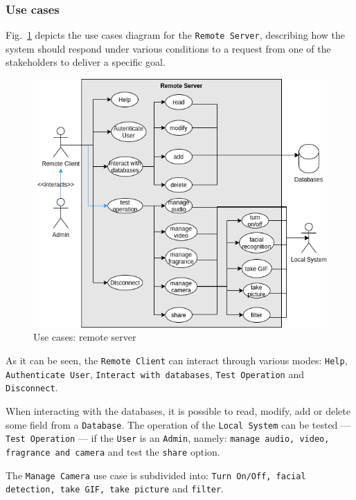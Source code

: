 \subsubsection{Use cases}
\label{sec:use-cases-2}
%
Fig.~\ref{fig:use-cases-rs} depicts the use cases diagram for the \texttt{Remote Server}, describing how the system should respond under various conditions to a request from one of the stakeholders to deliver a specific
goal.

\begin{figure}[htb!]
\centering
    \includegraphics[width=0.6\columnwidth]{./img/use-cases-rs.png}
  \caption{Use cases: remote server}%
\label{fig:use-cases-rs}
\end{figure}

As it can be seen, the \texttt{Remote Client} can interact through various
modes: \texttt{Help}, \texttt{Authenticate User}, \texttt{Interact with
  databases}, \texttt{Test Operation} and \texttt{Disconnect}.

When interacting with the databases, it is possible to read, modify, add or delete some field from a \texttt{Database}.
The operation of the \texttt{Local System} can be tested --- \texttt{Test
  Operation} --- if the \texttt{User} is an \texttt{Admin}, namely:
\texttt{manage audio, video, fragrance and camera} and test the \texttt{share} option.

The \texttt{Manage Camera} use case is subdivided into: \texttt{Turn On/Off, facial detection, take GIF, take picture} and \texttt{filter}.

